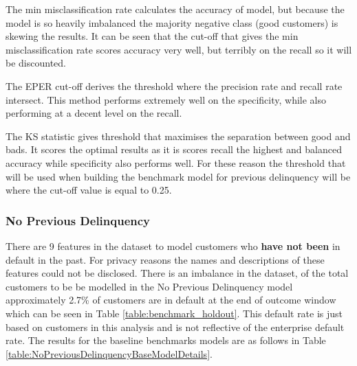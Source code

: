 The min misclassification rate calculates the accuracy of model, but because the model is so heavily imbalanced the majority negative class (good customers) is skewing the results. It can be seen that the cut-off that gives the min misclassification rate scores accuracy very well, but terribly on the recall so it will be discounted.

The EPER cut-off derives the threshold where the precision rate and recall rate intersect. This method performs extremely well on the specificity, while also performing at a decent level on the recall.

The KS statistic gives threshold that maximises the separation between good and bads. It scores the optimal results as it is scores recall the highest and balanced accuracy while specificity also performs well. For these reason the threshold that will be used when building the benchmark model for previous delinquency will be where the cut-off value is equal to 0.25.


\subsubsection{No Previous Delinquency}

There are 9 features in the dataset to model customers who \textbf{have not been} in default in the past. For privacy reasons the names and descriptions of these features could not be disclosed. There is an imbalance in the dataset, of the total customers to be be modelled in the No Previous Delinquency model approximately 2.7\% of customers are in default at the end of outcome window which can be seen in Table \ref{table:benchmark_holdout}. This default rate is just based on customers in this analysis and is not reflective of the enterprise default rate. The results for the baseline benchmarks models are as follows in Table \ref{table:NoPreviousDelinquencyBaseModelDetails}.

